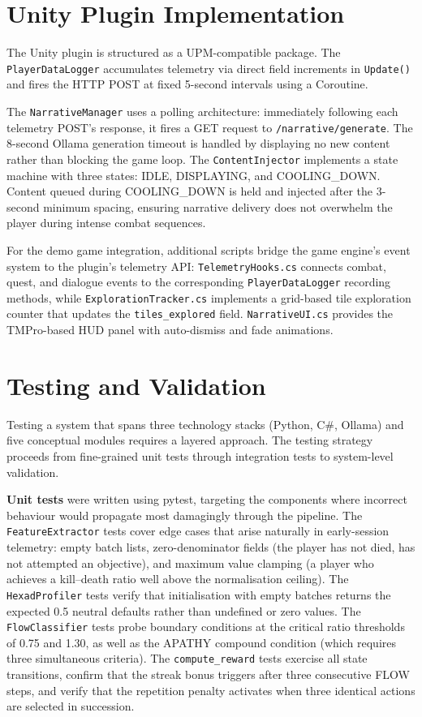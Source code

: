 \section{Unity Plugin Implementation}

The Unity plugin is structured as a UPM-compatible package. The \texttt{PlayerDataLogger} accumulates telemetry via direct field increments in \texttt{Update()} and fires the HTTP POST at fixed 5-second intervals using a Coroutine.

The \texttt{NarrativeManager} uses a polling architecture: immediately following each telemetry POST's response, it fires a GET request to \texttt{/narrative/generate}. The 8-second Ollama generation timeout is handled by displaying no new content rather than blocking the game loop. The \texttt{ContentInjector} implements a state machine with three states: IDLE, DISPLAYING, and COOLING\_DOWN. Content queued during COOLING\_DOWN is held and injected after the 3-second minimum spacing, ensuring narrative delivery does not overwhelm the player during intense combat sequences.

For the demo game integration, additional scripts bridge the game engine's event system to the plugin's telemetry API: \texttt{TelemetryHooks.cs} connects combat, quest, and dialogue events to the corresponding \texttt{PlayerDataLogger} recording methods, while \texttt{ExplorationTracker.cs} implements a grid-based tile exploration counter that updates the \texttt{tiles\_explored} field. \texttt{NarrativeUI.cs} provides the TMPro-based HUD panel with auto-dismiss and fade animations.

\section{Testing and Validation}

Testing a system that spans three technology stacks (Python, C\#, Ollama) and five conceptual modules requires a layered approach. The testing strategy proceeds from fine-grained unit tests through integration tests to system-level validation.

\textbf{Unit tests} were written using pytest, targeting the components where incorrect behaviour would propagate most damagingly through the pipeline. The \texttt{FeatureExtractor} tests cover edge cases that arise naturally in early-session telemetry: empty batch lists, zero-denominator fields (the player has not died, has not attempted an objective), and maximum value clamping (a player who achieves a kill--death ratio well above the normalisation ceiling). The \texttt{HexadProfiler} tests verify that initialisation with empty batches returns the expected 0.5 neutral defaults rather than undefined or zero values. The \texttt{FlowClassifier} tests probe boundary conditions at the critical ratio thresholds of 0.75 and 1.30, as well as the APATHY compound condition (which requires three simultaneous criteria). The \texttt{compute\_reward} tests exercise all state transitions, confirm that the streak bonus triggers after three consecutive FLOW steps, and verify that the repetition penalty activates when three identical actions are selected in succession.

